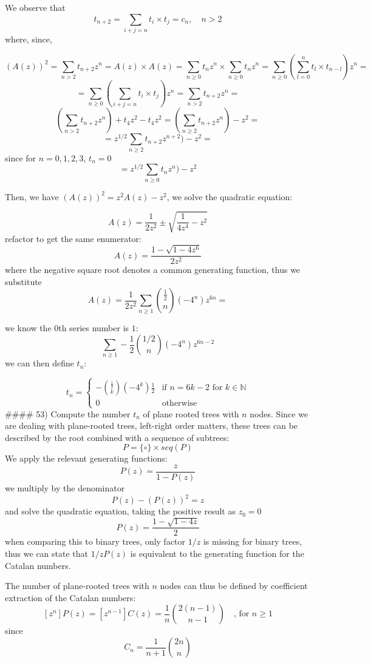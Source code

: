 \documentclass[
]{article}
\begin{document}
We observe that \[
t_{n+2} = \sum_{i+j=n} t_i \times t_j = c_n, \quad n > 2
\] where, since,

\[
(A(z))^2 = \sum_{n > 2} t_{n+2} z^n= A(z) \times A(z) = \sum_{n \geq 0} t_n z^n \times \sum_{n \geq 0} t_n z^n = \sum_{n \geq 0} (\sum_{l=0}^{n} t_l \times t_{n-l})z^n =
\] \[
= \sum_{n \geq 0} (\sum_{i+j=n} t_i \times t_j)z^n = \sum_{n > 2} t_{n+2} z^n =
\] \[
(\sum_{n > 2} t_{n+2} z^n) + t_4 z^2 - t_4 z^2 = (\sum_{n \geq 2} t_{n+2} z^n) - z^2 =
\] \[
= z^{1/2} \sum_{n \geq 2} t_{n+2} z^{n+2}) - z^2 =
\] since for \(n = 0,1,2,3\), \(t_n = 0\) \[
= z^{1/2} \sum_{n \geq 0} t_{n} z^{n}) - z^2 
\]

Then, we have \((A(z))^2 = z^2 A(z) - z^2\), we solve the quadratic
equation:

\[
A(z) = \frac{1}{2z^2} \pm \sqrt{\frac{1}{4z^4} - z^2}
\] refactor to get the same enumerator: \[
A(z) = \frac{1-\sqrt{1- 4z^6}}{2z^2}
\] where the negative square root denotes a common generating function,
thus we substitute \[
A(z) = \frac{1}{2z^2} \sum_{n \geq 1} \binom{\frac{1}{2}}{n} (-4^n) z^{6n} =
\]

we know the \(0\)th series number is \(1\): \[
\sum_{n \geq 1} -\frac{1}{2} \binom{1/2}{n} (-4^n) z^{6n -2}
\] we can then define \(t_n\):

\[  
t_n =
    \begin{cases}
      - \binom{\frac{1}{2}}{k} (-4^k) \frac{1}{2} & \text{if } n = 6k-2 \text{ for } k \in \mathbb{N}\\
      0 & \text{otherwise}
    \end{cases}       
\] \#\#\#\# 53) Compute the number \(t_n\) of plane rooted trees with
\(n\) nodes. Since we are dealing with plane-rooted trees, left-right
order matters, these trees can be described by the root combined with a
sequence of subtrees: \[
P = \{\circ \} \times seq(P)
\] We apply the relevant generating functions: \[
P(z) = \frac{z}{1- P(z)}
\] we multiply by the denominator \[
P(z) - (P(z))^2 = z
\] and solve the quadratic equation, taking the positive result as
\(z_0=0\) \[
P(z) = \frac{1-\sqrt{1-4z}}{2}
\] when comparing this to binary trees, only factor \(1/z\) is missing
for binary trees, thus we can state that \(1/zP(z)\) is equivalent to
the generating function for the Catalan numbers.

The number of plane-rooted trees with \(n\) nodes can thus be defined by
coefficient extraction of the Catalan numbers: \[
[z^n]P(z) = [z^{n-1}] C(z) = \frac{1}{n} \binom{2(n-1)}{n-1} \quad \text{, for } n\geq 1 
\] since \[
C_n = \frac{1}{n+1} \binom{2n}{n}
\]
\end{document}
